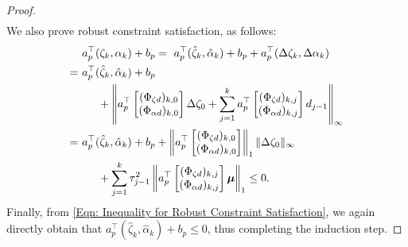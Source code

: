 \documentclass[letterpaper, 10 pt, conference]{ieeeconf}
\newcommand{\?}{\stackrel{?}{=}}
\newcommand{\paramSet}{\Theta}
\newcommand{\ratePGDNominal}{\hat\ratePGD}
\newcommand{\ratePGDError}{\Delta\ratePGD}
\newcommand{\disturbance}{d}
\newcommand{\ratePGD}{\alpha}
\newcommand{\systemResponse}{\Phi}
\newcommand{\state}{\zeta}
\newcommand{\stateNominal}{\hat\state}
\newcommand{\stateError}{\Delta\state}
\newcommand{\tubeSize}{\tau}
\newcommand{\hessianBoundStacked}{\boldsymbol{\mu}}
\newcommand{\diam}{\text{diam}}
\newcommand{\ratePGDBoundSlope}{a}
\newcommand{\ratePGDBoundOffset}{b}
\begin{document}
\begin{proof}
{\begin{align}
\end{align}
}
\hspace{-1mm}We also prove robust constraint satisfaction, as follows:
{
\setlength{\abovedisplayskip}{4pt}
\setlength{\belowdisplayskip}{4pt}
\begin{align} \nonumber
    &\ratePGDBoundSlope_p^\top (\state_k, \ratePGD_k) + \ratePGDBoundOffset_p 
    = \ \ratePGDBoundSlope_p^\top (\stateNominal_k, \ratePGDNominal_k) + \ratePGDBoundOffset_p + \ratePGDBoundSlope_p^\top (\stateError_k, \ratePGDError_k) \\ \nonumber
    = \ &\ratePGDBoundSlope_p^\top (\stateNominal_k, \ratePGDNominal_k) + \ratePGDBoundOffset_p \\ \nonumber
    &\hspace{5mm} + 
    \left\Vert 
    \ratePGDBoundSlope_p^\top
    \begin{bmatrix}
        (\systemResponse_{\state \disturbance})_{k, 0} \\
        (\systemResponse_{\ratePGD \disturbance})_{k, 0}
    \end{bmatrix}
    \stateError_0
    + \sum_{j=1}^{k}
    \ratePGDBoundSlope_p^\top
    \begin{bmatrix}
        (\systemResponse_{\state \disturbance})_{k, j} \\
        (\systemResponse_{\ratePGD \disturbance})_{k, j}
    \end{bmatrix}
    \disturbance_{j-1}
    \right\Vert_\infty \\ \nonumber
    = \ &\ratePGDBoundSlope_p^\top (\stateNominal_k, \ratePGDNominal_k) + \ratePGDBoundOffset_p + 
    \left\Vert 
    \ratePGDBoundSlope_p^\top
    \begin{bmatrix}
        (\systemResponse_{\state \disturbance})_{k, 0} \\
        (\systemResponse_{\ratePGD \disturbance})_{k, 0}
    \end{bmatrix}
    \right\Vert_1
    \Vert \stateError_0 \Vert_\infty
    \\
    \label{Eqn: Apply Inequality for Robust Constraint Satisfaction, k geq 1}
    &\hspace{5mm} + \sum_{j=1}^{k} \tubeSize_{j-1}^2
    \left\Vert
    \ratePGDBoundSlope_p^\top
    \begin{bmatrix}
        (\systemResponse_{\state \disturbance})_{k, j} \\
        (\systemResponse_{\ratePGD \disturbance})_{k, j}
    \end{bmatrix}
    \hessianBoundStacked
    \right\Vert_1 
    \leq 0.
\end{align}
}
\hspace{-1mm}Finally, from \eqref{Eqn: Inequality for Robust Constraint Satisfaction}, we again directly obtain that $\ratePGDBoundSlope_p^\top (\stateNominal_k, \ratePGDNominal_k) + \ratePGDBoundOffset_p \leq 0$, thus completing the induction step.
\end{proof}
\end{document}
